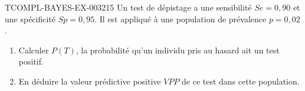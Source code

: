 \begin{exercice}{TCOMPL-BAYES-EX-003}{2}{15}
Un test de dépistage a une sensibilité $Se=0{,}90$ et une spécificité $Sp=0{,}95$. Il est appliqué à une population de prévalence $p=0{,}02$.
\begin{enumerate}
  \item Calculer $P(T)$, la probabilité qu'un individu pris au hasard ait un test positif.
  \item En déduire la valeur prédictive positive $VPP$ de ce test dans cette population.
\end{enumerate}
\end{exercice}
